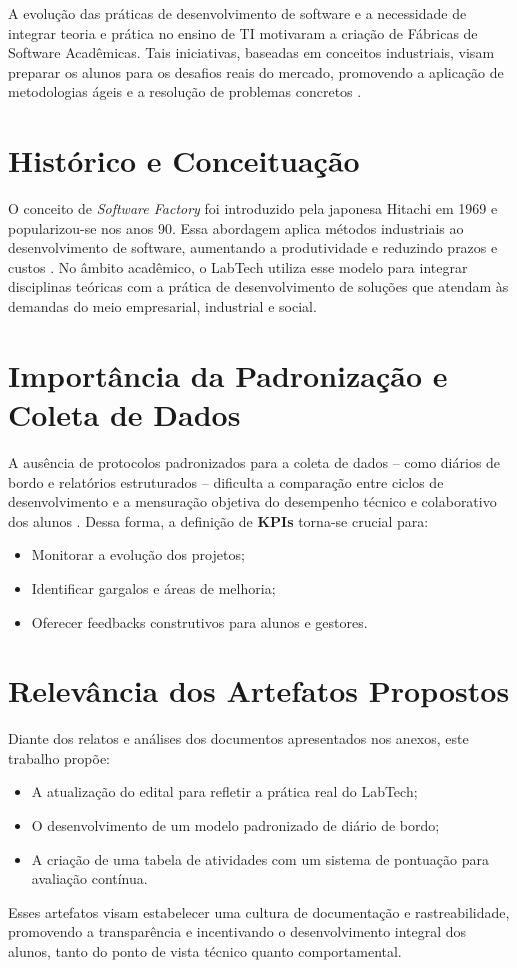 A evolução das práticas de desenvolvimento de software e a necessidade de integrar teoria e prática no ensino de TI motivaram a criação de Fábricas de Software Acadêmicas. Tais iniciativas, baseadas em conceitos industriais, visam preparar os alunos para os desafios reais do mercado, promovendo a aplicação de metodologias ágeis e a resolução de problemas concretos \cite{dos2021experiencia, neto2017relato}.

\section{Histórico e Conceituação}
O conceito de \textit{Software Factory} foi introduzido pela japonesa Hitachi em 1969 e popularizou-se nos anos 90. Essa abordagem aplica métodos industriais ao desenvolvimento de software, aumentando a produtividade e reduzindo prazos e custos \cite{romanha2016modelo}. No âmbito acadêmico, o LabTech utiliza esse modelo para integrar disciplinas teóricas com a prática de desenvolvimento de soluções que atendam às demandas do meio empresarial, industrial e social.

\section{Importância da Padronização e Coleta de Dados}
A ausência de protocolos padronizados para a coleta de dados – como diários de bordo e relatórios estruturados – dificulta a comparação entre ciclos de desenvolvimento e a mensuração objetiva do desempenho técnico e colaborativo dos alunos \cite{oliveira2017conduccao}. Dessa forma, a definição de \textbf{KPIs} torna-se crucial para:
\begin{itemize}[label=\textbullet]
    \item Monitorar a evolução dos projetos;
    \item Identificar gargalos e áreas de melhoria;
    \item Oferecer feedbacks construtivos para alunos e gestores.
\end{itemize}

\section{Relevância dos Artefatos Propostos}
Diante dos relatos e análises dos documentos apresentados nos anexos, este trabalho propõe:
\begin{itemize}[label=\textbullet]
    \item A atualização do edital para refletir a prática real do LabTech;
    \item O desenvolvimento de um modelo padronizado de diário de bordo;
    \item A criação de uma tabela de atividades com um sistema de pontuação para avaliação contínua.
\end{itemize}
Esses artefatos visam estabelecer uma cultura de documentação e rastreabilidade, promovendo a transparência e incentivando o desenvolvimento integral dos alunos, tanto do ponto de vista técnico quanto comportamental.

